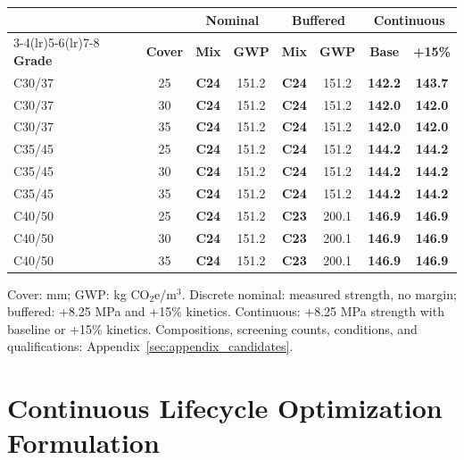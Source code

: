 \documentclass[journal]{IEEEtran}
\begin{document}
\begin{table}[!t]
\begin{minipage}[t]{0.49\textwidth}
\begin{tabular*}{\linewidth}{@{\extracolsep{\fill}}lc cc cc cc@{}}
\toprule
& & \multicolumn{2}{c}{\textbf{Nominal}} & \multicolumn{2}{c}{\textbf{Buffered}} & \multicolumn{2}{c}{\textbf{Continuous}} \\
\cmidrule(lr){3-4}\cmidrule(lr){5-6}\cmidrule(lr){7-8}
\textbf{Grade} & \textbf{Cover} & \textbf{Mix} & \textbf{GWP} & \textbf{Mix} & \textbf{GWP} & \textbf{Base} & \textbf{+15\%} \\
\midrule
C30/37 & 25 & \textbf{C24} & 151.2 & \textbf{C24} & 151.2 & \textbf{142.2} & \textbf{143.7} \\
C30/37 & 30 & \textbf{C24} & 151.2 & \textbf{C24} & 151.2 & \textbf{142.0} & \textbf{142.0} \\
C30/37 & 35 & \textbf{C24} & 151.2 & \textbf{C24} & 151.2 & \textbf{142.0} & \textbf{142.0} \\
\addlinespace[2pt]
C35/45 & 25 & \textbf{C24} & 151.2 & \textbf{C24} & 151.2 & \textbf{144.2} & \textbf{144.2} \\
C35/45 & 30 & \textbf{C24} & 151.2 & \textbf{C24} & 151.2 & \textbf{144.2} & \textbf{144.2} \\
C35/45 & 35 & \textbf{C24} & 151.2 & \textbf{C24} & 151.2 & \textbf{144.2} & \textbf{144.2} \\
\addlinespace[2pt]
C40/50 & 25 & \textbf{C24} & 151.2 & \textbf{C23} & 200.1 & \textbf{146.9} & \textbf{146.9} \\
C40/50 & 30 & \textbf{C24} & 151.2 & \textbf{C23} & 200.1 & \textbf{146.9} & \textbf{146.9} \\
C40/50 & 35 & \textbf{C24} & 151.2 & \textbf{C23} & 200.1 & \textbf{146.9} & \textbf{146.9} \\
\bottomrule
\end{tabular*}
\end{minipage}
\vspace{4pt}
\begin{minipage}{\textwidth}
\footnotesize
Cover: mm; GWP: kg CO$_2$e/m$^3$. Discrete nominal: measured strength, no margin; buffered: +8.25 MPa and +15\% kinetics. Continuous: +8.25 MPa strength with baseline or +15\% kinetics. Compositions, screening counts, conditions, and qualifications: Appendix~\ref{sec:appendix_candidates}.
\end{minipage}
\end{table}

\section{Continuous Lifecycle Optimization Formulation}
\end{document}
